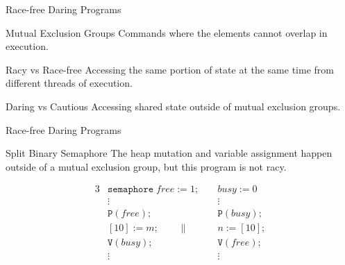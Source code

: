 \documentclass{beamer}
\begin{document}
\begin{frame}{Race-free Daring Programs}
  \begin{block}{Mutual Exclusion Groups}
    Commands where the elements cannot overlap in execution.
  \end{block}

  \begin{block}{Racy vs Race-free}
    Accessing the same portion of state at the same time from different threads of execution.
  \end{block}

  \begin{block}{Daring vs Cautious}
    Accessing shared state outside of mutual exclusion groups.
  \end{block}
\end{frame}

\begin{frame}{Race-free Daring Programs}
  \begin{block}{Split Binary Semaphore}
    The heap mutation and variable assignment happen outside of a mutual exclusion group, but this program is not racy.
  \end{block}

  \begin{example}
    \begin{alignat*}{3}
      & \mathtt{semaphore}\; free := 1;\; &&busy := 0 \\
      & \vdots            && \vdots \\
      & \mathtt{P}(free); && \mathtt{P}(busy); \\
      & [10] := m; \qquad \|     && n := [10]; \\
      & \mathtt{V}(busy); && \mathtt{V}(free); \\
      & \vdots            && \vdots
    \end{alignat*}
  \end{example}
\end{frame}
\end{document}
